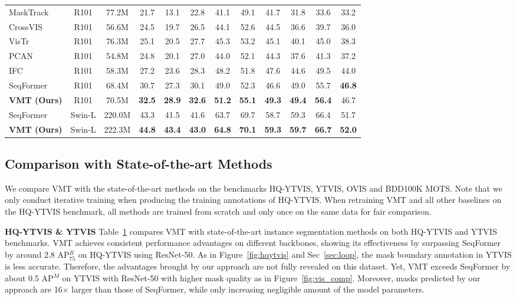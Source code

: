 \documentclass[runningheads]{llncs}
\newcommand{\parsection}[1]{\textbf{#1} }
\begin{document}
\begin{table}[!t]
{\begin{tabular}{l|c|c|ccc|ccc|ccc}
					\midrule
					MaskTrack~\cite{yang2019video} & R101 & 77.2M & 21.7 & 13.1 & 22.8 & 41.1 & 49.1 & 41.7 & 31.8 & 33.6 & 33.2 \\
					CrossVIS~\cite{Yang_2021_ICCV} & R101 & 56.6M & 24.5 & 19.7 & 26.5 & 44.1 & 52.6 & 44.5 & 36.6 & 39.7 & 36.0 \\
					VisTr~\cite{wang2020end} & R101 & 76.3M & 25.1 & 20.5 & 27.7 & 45.3 & 53.2 & 45.1 & 40.1 & 45.0 & 38.3 \\
					PCAN~\cite{pcan} & R101 & 54.8M & 24.8 & 20.1 & 27.0 & 44.0 & 52.1 & 44.3 & 37.6 & 41.3 & 37.2 \\ IFC~\cite{hwang2021video} & R101 & 58.3M  & 27.2 & 23.6 & 28.3 & 48.2 & 51.8 & 47.6 & 44.6 & 49.5 & 44.0 \\ SeqFormer~\cite{wu2021seqformer} & R101 & 68.4M & 30.7 & 27.3 & 30.1 & 49.0 & 52.3 & 46.6  & 49.0 & 55.7 & \textbf{46.8} \\
					\textbf{VMT (Ours)} & R101 & 70.5M & \textbf{32.5} & \textbf{28.9} & \textbf{32.6} & \textbf{51.2} & \textbf{55.1} & \textbf{49.3} & \textbf{49.4} & \textbf{56.4} & 46.7 \\
					\midrule
					SeqFormer~\cite{wu2021seqformer} & Swin-L & 220.0M & 43.3 & 41.5  & 41.6 & 63.7 & 69.7 & 58.7 & 59.3 & 66.4 & 51.7 \\
					\textbf{VMT (Ours)} & Swin-L & 222.3M & \textbf{44.8} & \textbf{43.4}  & \textbf{43.0} & \textbf{64.8} & \textbf{70.1} & \textbf{59.3}  & \textbf{59.7} & \textbf{66.7} & \textbf{52.0} \\
				\bottomrule	\end{tabular}}
		\label{tab:viscomp}
\end{table}
	
\subsection{Comparison with State-of-the-art Methods}
We compare VMT with the state-of-the-art methods on the benchmarks HQ-YTVIS, YTVIS, OVIS and BDD100K MOTS.
Note that we only conduct iterative training when producing the training annotations of HQ-YTVIS. When retraining VMT and all other baselines on the HQ-YTVIS benchmark, all methods are trained from scratch and only once on the same data for fair comparison.


\parsection{HQ-YTVIS \& YTVIS} Table~\ref{tab:viscomp} compares VMT with state-of-the-art instance segmentation methods on both HQ-YTVIS and YTVIS benchmarks.
VMT achieves consistent performance advantages on different backbones, showing its effectiveness by surpassing SeqFormer~\cite{wu2021seqformer} by around 2.8 AP$^B_{75}$ on HQ-YTVIS using ResNet-50. As in Figure~\ref{fig:hqytvis} and Sec~\ref{sec:loop}, the mask boundary annotation in YTVIS is less accurate. Therefore, the advantages brought by our approach are not fully revealed on this dataset. Yet, VMT exceeds SeqFormer by about 0.5 AP$^M$ on YTVIS with ResNet-50 with higher mask quality as in Figure~\ref{fig:vis_comp}. Moreover, masks predicted by our approach are 16$\times$ larger than those of SeqFormer, while only increasing negligible amount of the model parameters. 
\end{document}
